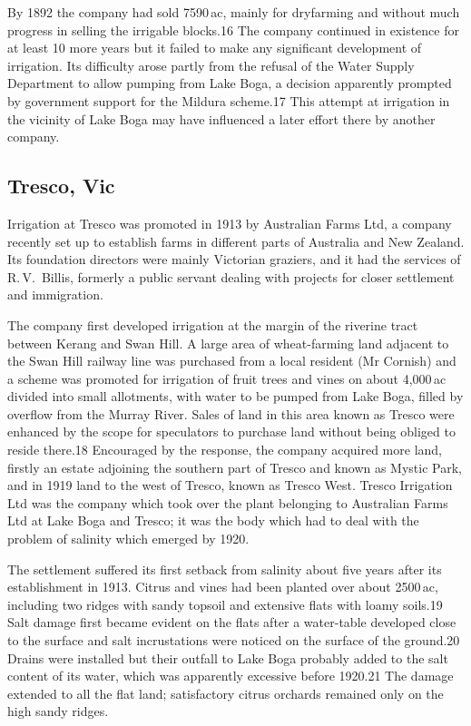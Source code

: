 By 1892 the company had sold 7590\,ac, mainly for dryfarming and
without much progress in selling the irrigable blocks.16 The company
continued in existence for at least 10 more years but it failed to
make any significant development of irrigation. Its difficulty arose
partly from the refusal of the Water Supply Department to allow
pumping from Lake Boga, a decision apparently prompted by government
support for the Mildura scheme.17 This attempt at irrigation in the
vicinity of Lake Boga may have influenced a later effort there by
another company.

\subsection{Tresco, Vic}

Irrigation at Tresco was promoted in 1913 by Australian Farms Ltd, a
company recently set up to establish farms in different parts of
Australia and New Zealand.  Its foundation directors were mainly
Victorian graziers, and it had the services of R.\,V.~Billis, formerly
a public servant dealing with projects for closer settlement and
immigration.

The company first developed irrigation at the margin of the riverine
tract between Kerang and Swan Hill.  A large area of wheat-farming
land adjacent to the Swan Hill railway line was purchased from a local
resident (Mr Cornish) and a scheme was promoted for irrigation of
fruit trees and vines on about 4,000\,ac divided into small
allotments, with water to be pumped from Lake Boga, filled by overflow
from the Murray River. Sales of land in this area known as Tresco were
enhanced by the scope for speculators to purchase land without being
obliged to reside there.18 Encouraged by the response, the company
acquired more land, firstly an estate adjoining the southern part of
Tresco and known as Mystic Park, and in 1919 land to the west of
Tresco, known as Tresco West.  Tresco Irrigation Ltd was the company
which took over the plant belonging to Australian Farms Ltd at Lake
Boga and Tresco; it was the body which had to deal with the problem of
salinity which emerged by 1920.

The settlement suffered its first setback from salinity about five
years after its establishment in 1913.  Citrus and vines had been
planted over about 2500\,ac, including two ridges with sandy topsoil
and extensive flats with loamy soils.19 Salt damage first became
evident on the flats after a water-table developed close to the
surface and salt incrustations were noticed on the surface of the
ground.20 Drains were installed but their outfall to Lake Boga
probably added to the salt content of its water, which was apparently
excessive before 1920.21 The damage extended to all the flat land;
satisfactory citrus orchards remained only on the high sandy ridges.

